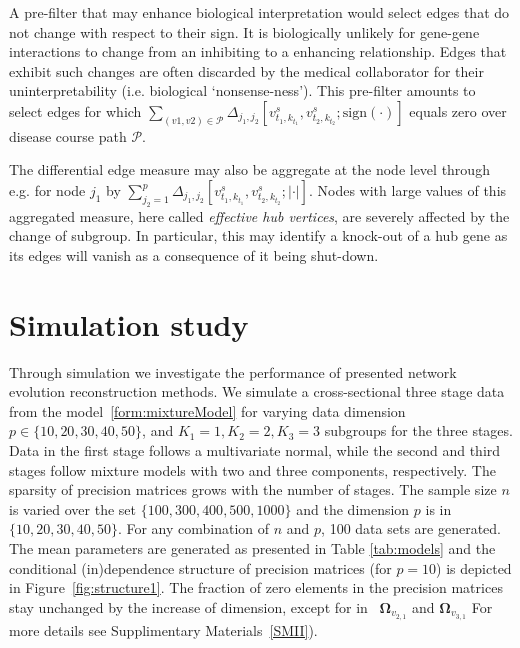 \documentclass[10pt]{article}
\newcommand{\red}[1]{{\textcolor {red} {#1}}}
\begin{document}
A pre-filter that may enhance biological interpretation would select edges that do not change with respect to their sign. It is biologically unlikely for gene-gene interactions to change from an inhibiting to a enhancing relationship. Edges that exhibit such changes are often discarded by the medical collaborator for their uninterpretability (i.e. biological `nonsense-ness'). This pre-filter amounts to select edges for which $\sum_{(v1,v2)\in \mathcal{P}} \Delta_{j_1,j_2} [v^s_{t_1, k_{t_1}}, v^s_{t_2, k_{t_2}}; \mbox{sign}(\cdot)]$ equals zero over disease course path $\mathcal{P}$.

The differential edge measure may also be aggregate at the node level through e.g. for node $j_1$ by $\sum_{j_2=1}^p \Delta_{j_1,j_2} [v^s_{t_1, k_{t_1}}, v^s_{t_2, k_{t_2}}; |\cdot|]$. Nodes with large values of this aggregated measure, here called \textit{effective hub vertices}, are severely affected by the change of subgroup. In particular, this may identify a knock-out of a hub gene as its edges will vanish as a consequence of it being shut-down. 


\section{Simulation study}\label{sec:simulation}
Through simulation we investigate the performance of presented 
network evolution reconstruction methods. We simulate a cross-sectional three stage data from the model~\eqref{form:mixtureModel} for varying data dimension $p\in \{10,20,30,40,50\}$, and $K_1=1, K_2=2, K_3=3$ subgroups for the three stages. Data in the first stage follows a multivariate normal, while the second and third stages follow mixture models with two and three components, respectively.  The sparsity of precision matrices grows with the number of stages. The sample size $n$ is varied  over the set $\{ 100, 300,400, 500, 1000 \}$ and the dimension $p$ is in $\{10,20,30,40,50\}$. For any combination of $n$ and $p$, 100 data sets are generated. The mean parameters are generated as presented in Table \ref{tab:models} and the conditional (in)dependence structure of precision matrices (for $p=10$) is depicted in Figure~\ref{fig:structure1}. The fraction of zero elements in the precision matrices stay unchanged by the increase of dimension, except for in ~$\mathbf{\Omega}_{v_{2,1}}$ and $\mathbf{\Omega}_{v_{3,1}}$ %
For more details see Supplimentary Materials~\ref{SMII}). %
\end{document}
